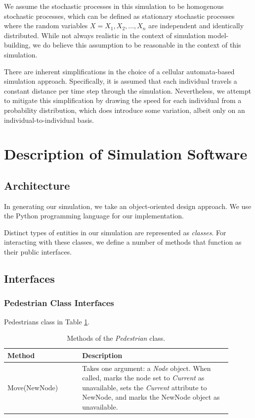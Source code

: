 \documentclass[12pt]{article}
\begin{document}
We assume the stochastic processes in this simulation to be homogenous
stochastic processes, which can be defined as stationary stochastic processes
where the random variables $X = X_1, X_2, ..., X_n$ are independent and
identically distributed. While not always realistic in the context of
simulation model-building, we do believe this assumption to be reasonable in
the context of this simulation.

There are inherent simplifications in the choice of a cellular automata-based
simulation approach. Specifically, it is assumed that each individual travels
a constant distance per time step through the simulation. Nevertheless, we
attempt to mitigate this simplification by drawing the speed for each
individual from a probability distribution, which does introduce some
variation, albeit only on an individual-to-individual basis.

\section{Description of Simulation Software}

\subsection{Architecture}
In generating our simulation, we take an object-oriented design approach. We use
the Python programming language for our implementation.

Distinct types of entities in our simulation are represented as
\textit{classes}. For interacting with these classes, we define a number of
methods that function as their public interfaces.

\subsection{Interfaces}

\subsubsection{Pedestrian Class Interfaces}
Pedestrians class in Table \ref{table:pedestrian_methods}.

\def\arraystretch{1.5}
\begin{table}
  \centering
    \begin{tabular}{p{0.3\linewidth}p{0.6\linewidth}}
     \hline
     Method & Description \\
     \hline
     Move(NewNode) & Takes one argument: a \textit{Node} object. When called,
                     marks the node set to \textit{Current} as unavailable,
                     sets the \textit{Current} attribute to NewNode,
                     and marks the NewNode object as unavailable. \\
     \hline
    \end{tabular}
    \caption{Methods of the \textit{Pedestrian} class.}
  \label{table:pedestrian_methods}
\end{table}
\end{document}
